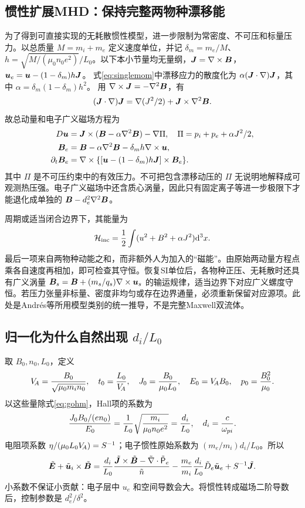 \subsection{惯性扩展MHD：保持完整两物种漂移能}
为了得到可直接实现的无耗散惯性模型，进一步限制为常密度、不可压和标量压力。以总质量 $M=m_i+m_e$ 定义速度单位，并记 $\delta_m=m_e/M$、$h=\sqrt{M/(\mu_0n_0e^2)}/L_0$。以下本小节量均无量纲，$\bm{J}=\nabla\times\bm{B}$，$\bm{u}_e=\bm{u}-(1-\delta_m)h\bm{J}$。
式\eqref{eq:singlemom}中漂移应力的散度化为
$\alpha(\bm{J}\cdot\nabla)\bm{J}$，其中 $\alpha=\delta_m(1-\delta_m)h^2$。
用 $\nabla\times\bm{J}=-\nabla^2\bm{B}$，有
\begin{equation}
(\bm{J}\cdot\nabla)\bm{J}=\nabla(J^2/2)+\bm{J}\times\nabla^2\bm{B}.
\end{equation}
故总动量和电子广义磁场方程为
\begin{align}
D\bm{u}&=\bm{J}\times(\bm{B}-\alpha\nabla^2\bm{B})-\nabla\Pi,
\quad\Pi=p_i+p_e+\alpha J^2/2,\\
\bm{B}_e&=\bm{B}-\alpha\nabla^2\bm{B}-\delta_mh\nabla\times\bm{u},\\
\partial_t\bm{B}_e&=\nabla\times\{[\bm{u}-(1-\delta_m)h\bm{J}]\times\bm{B}_e\}.
\end{align}
其中 $\Pi$ 是不可压约束中的有效压力。不可把包含漂移动压的 $\Pi$ 无说明地解释成可观测热压强。电子广义磁场中还含质心涡量，因此只有固定离子等进一步极限下才能退化成单独的 $\bm{B}-d_e^2\nabla^2\bm{B}$。

周期或适当闭合边界下，其能量为
\begin{equation}
\mathcal H_{\rm inc}={1\over2}\int(u^2+B^2+\alpha J^2)\mathrm d^3x.
\end{equation}
最后一项来自两物种动能之和，而非额外人为加入的“磁能”。由原始两动量方程点乘各自速度再相加，即可检查其守恒。恢复SI单位后，各物种正压、无耗散时还具有广义涡量
$\bm{B}_s=\bm{B}+(m_s/q_s)\nabla\times\bm{u}_s$ 的输运规律，适当边界下对应广义螺度守恒。若压力张量非标量、密度非均匀或存在边界通量，必须重新保留对应源项。此处是Andr\'es等所用模型类别的统一推导，不是完整Maxwell双流体。\citep{Andres2014,Andres2016}

\subsection{归一化为什么自然出现 $d_i/L_0$}
取 $B_0,n_0,L_0$，定义
\begin{equation}V_{\!A}={B_0\over\sqrt{\mu_0m_in_0}},\quad t_0={L_0\over V_{\!A}},\quad
J_0={B_0\over\mu_0L_0},\quad E_0=V_{\!A} B_0,\quad p_0={B_0^2\over\mu_0}.
\end{equation}
以这些量除式\eqref{eq:gohm}，Hall项的系数为
\begin{equation}{J_0B_0/(en_0)\over E_0}={1\over L_0}\sqrt{m_i\over\mu_0n_0e^2}={d_i\over L_0},\quad d_i={c\over\omega_{pi}}.
\end{equation}
电阻项系数 $\eta/(\mu_0L_0V_{\!A})=S^{-1}$；电子惯性原始系数为 $(m_e/m_i)d_i/L_0$。所以
\begin{equation}\tilde{\bm{E}}+\tilde{\bm{u}}_i\times\tilde{\bm{B}}={d_i\over L_0}{\tilde{\bm{J}}\times\tilde{\bm{B}}-\tilde{\nabla}\cdot\tilde{\mathsf P}_e\over\tilde n}
-{m_e\over m_i}{d_i\over L_0}\tilde D_e\tilde{\bm{u}}_e+S^{-1}\tilde{\bm{J}}.
\end{equation}
小系数不保证小贡献：电子层中 $u_e$ 和空间导数会大。将惯性转成磁场二阶导数后，控制参数是 $d_e^2/\delta^2$。

